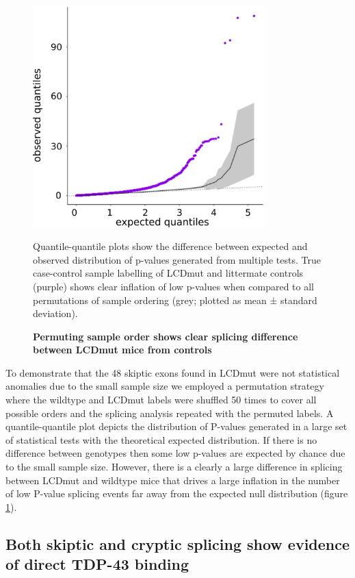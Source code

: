 \begin{figure}[h!]
	\begin{center}
		\includegraphics[width=9cm]{Figures/05_tdp_mice/permutation_ribbon.png}
	\end{center}
	\caption{\textbf{Permuting sample order shows clear splicing difference between LCDmut mice from controls}}
	Quantile-quantile plots show the difference between expected and observed distribution of p-values generated from multiple tests. True case-control sample labelling of LCDmut and littermate controls (purple) shows clear inflation of low p-values when compared to all permutations of sample ordering (grey; plotted as mean ± standard deviation).
	\label{fig:permutation}
\end{figure}

To demonstrate that the 48 skiptic exons found in LCDmut were not statistical anomalies due to the small sample size we employed a permutation strategy where the wildtype and LCDmut labels were shuffled 50 times to cover all possible orders and the splicing analysis repeated with the permuted labels. A quantile-quantile plot depicts the distribution of P-values generated in a large set of statistical tests with the theoretical expected distribution. If there is no difference between genotypes then some low p-values are expected by chance due to the small sample size. However, there is a clearly a large difference in splicing between LCDmut and wildtype mice that drives a large inflation in the number of low P-value splicing events far away from the expected null distribution (figure \ref{fig:permutation}).   


\subsection{Both skiptic and cryptic splicing show evidence of direct TDP-43 binding}

